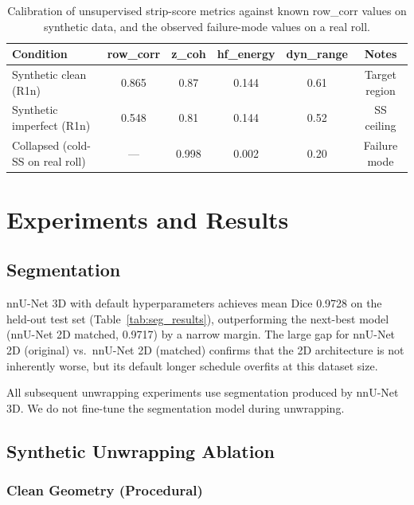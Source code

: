 \documentclass[11pt,a4paper]{article}
\begin{document}
\begin{table}[H]
\centering
\begin{tabular}{lccccc}
\toprule
Condition & row\_corr & z\_coh & hf\_energy & dyn\_range & Notes \\
\midrule
Synthetic clean (R1n) & 0.865 & 0.87 & 0.144 & 0.61 & Target region \\
Synthetic imperfect (R1n) & 0.548 & 0.81 & 0.144 & 0.52 & SS ceiling \\
Collapsed (cold-SS on real roll) & --- & 0.998 & 0.002 & 0.20 & Failure mode \\
\bottomrule
\end{tabular}
\caption{Calibration of unsupervised strip-score metrics against known row\_corr values on synthetic data, and the observed failure-mode values on a real roll.}
\label{tab:score_calib}
\end{table}


\section{Experiments and Results}

\subsection{Segmentation}

nnU-Net 3D with default hyperparameters achieves mean Dice 0.9728 on the held-out test set (Table~\ref{tab:seg_results}), outperforming the next-best model (nnU-Net 2D matched, 0.9717) by a narrow margin. The large gap for nnU-Net 2D (original) vs.\ nnU-Net 2D (matched) confirms that the 2D architecture is not inherently worse, but its default longer schedule overfits at this dataset size.

All subsequent unwrapping experiments use segmentation produced by nnU-Net 3D. We do not fine-tune the segmentation model during unwrapping.

\subsection{Synthetic Unwrapping Ablation}
\label{sec:results_synth}

\subsubsection{Clean Geometry (Procedural)}
\end{document}
